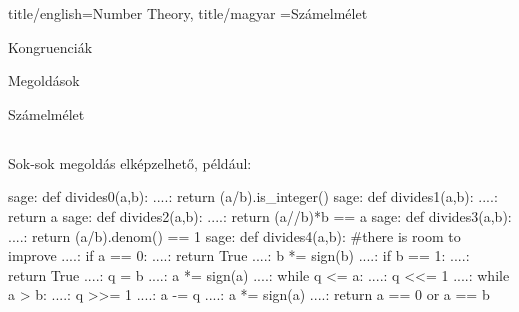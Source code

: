 \documentclass{amsbook}
\begin{document}
\begin{Part*}{
    title/english=Number Theory,
    title/magyar =Számelmélet}
\begin{section}{Kongruenciák}
\end{section}

\end{Part*}

\begin{part}{Megoldások}

  \begin{section}{Számelmélet}

    \subsection{} Sok-sok megoldás elképzelhet\H o, például:
      \begin{sageexample}
          sage: def divides0(a,b):
          ....:     return (a/b).is_integer()
          sage: def divides1(a,b):
          ....:     return a %
          sage: def divides2(a,b):
          ....:     return (a//b)*b == a
          sage: def divides3(a,b):
          ....:     return (a/b).denom() == 1
          sage: def divides4(a,b): #there is room to improve
          ....:     if a == 0:
          ....:         return True
          ....:     b *= sign(b)
          ....:     if b == 1:
          ....:         return True
          ....:     q = b
          ....:     a *= sign(a)
          ....:     while q <= a:
          ....:         q <<= 1
          ....:     while a > b:
          ....:         q >>= 1
          ....:         a -= q  
          ....:         a *= sign(a)
          ....:     return a == 0 or a == b

          \end{sageexample}

      \end{section}

    \end{part}

    
\end{document}
